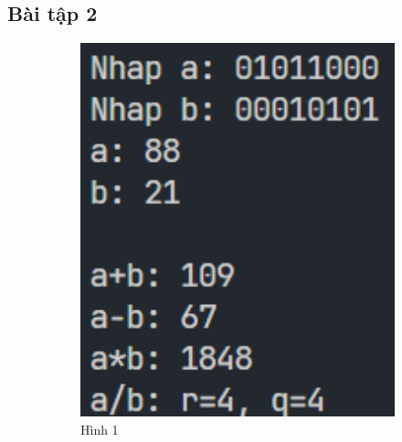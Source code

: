 \documentclass[a4paper,12pt]{report}
\begin{document}
\subsection{Bài tập 2}
\begin{figure}[!ht]
	\centering
	\begin{subfigure}{0.36\textwidth}
		\centering
		\includegraphics[width=1\textwidth]{imgs/2-1.png}
		\caption{Hình 1}
	\end{subfigure}
	\hfill
	\begin{subfigure}{0.36\textwidth}
		\centering

\end{subfigure}
\end{figure}
\end{document}
